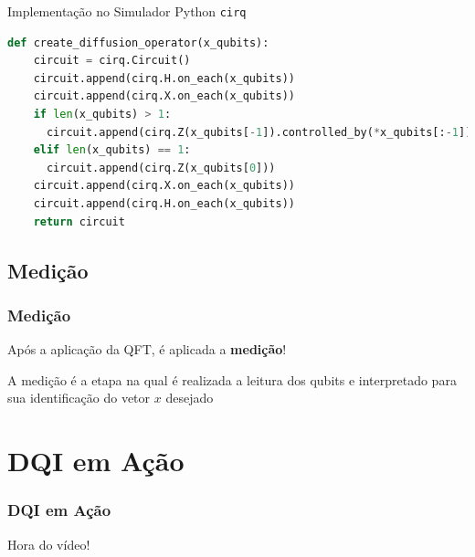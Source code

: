 \documentclass[aspectratio=169]{beamer}
\begin{document}
\begin{frame}[fragile]
  
  \begin{block}{Implementação no Simulador Python \lstinline|cirq|}
  \begin{lstlisting}[language=Python, frame=single, basicstyle=\tiny]
def create_diffusion_operator(x_qubits):
    circuit = cirq.Circuit()
    circuit.append(cirq.H.on_each(x_qubits))
    circuit.append(cirq.X.on_each(x_qubits))
    if len(x_qubits) > 1:
      circuit.append(cirq.Z(x_qubits[-1]).controlled_by(*x_qubits[:-1]))
    elif len(x_qubits) == 1:
      circuit.append(cirq.Z(x_qubits[0]))
    circuit.append(cirq.X.on_each(x_qubits))
    circuit.append(cirq.H.on_each(x_qubits))
    return circuit
  \end{lstlisting}
  \end{block}
\end{frame}

\subsection{Medição}
\begin{frame}
  \frametitle{Medição}

  Após a aplicação da QFT, é aplicada a \textbf{medição}! 

    \vspace{1cm}
  
  A medição é a etapa na qual é realizada a leitura dos qubits e interpretado para sua identificação do vetor $x$ desejado 

\end{frame}

\section{DQI em Ação}
\begin{frame}
  \frametitle{DQI em Ação}

  Hora do vídeo!
  
\end{frame}
\end{document}
